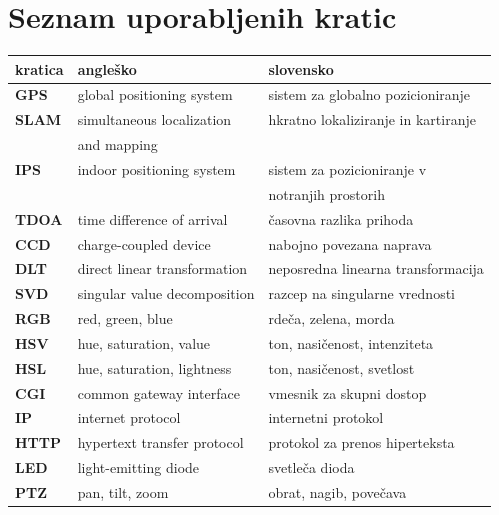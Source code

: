 \documentclass[a4paper, 12pt]{book}
\newcommand{\clearemptydoublepage}{\newpage{\pagestyle{empty}\cleardoublepage}}
\begin{document}
\clearemptydoublepage


\chapter*{Seznam uporabljenih kratic}

\begin{tabular}{l|l|l}
  {\bf kratica} & {\bf angleško} & {\bf slovensko} \\ \hline
  {\bf GPS} & global positioning system & sistem za globalno pozicioniranje \\
  {\bf SLAM} & simultaneous localization & hkratno lokaliziranje in kartiranje \\
            & and mapping & \\
  {\bf IPS} & indoor positioning system & sistem za pozicioniranje v \\
  			& 							& notranjih prostorih \\
  {\bf TDOA} & time difference of arrival & časovna razlika prihoda \\
  {\bf CCD} & charge-coupled device & nabojno povezana naprava \\
  {\bf DLT} & direct linear transformation & neposredna linearna transformacija \\
  {\bf SVD} & singular value decomposition & razcep na singularne vrednosti \\
  {\bf RGB} & red, green, blue & rdeča, zelena, morda \\
  {\bf HSV} & hue, saturation, value & ton, nasičenost, intenziteta \\
  {\bf HSL} & hue, saturation, lightness & ton, nasičenost, svetlost \\
  {\bf CGI} & common gateway interface & vmesnik za skupni dostop \\
  {\bf IP} & internet protocol & internetni protokol \\
  {\bf HTTP} & hypertext transfer protocol & protokol za prenos hiperteksta \\
  {\bf LED} & light-emitting diode & svetleča dioda \\
  {\bf PTZ} & pan, tilt, zoom & obrat, nagib, povečava \\
\end{tabular}
\end{document}
